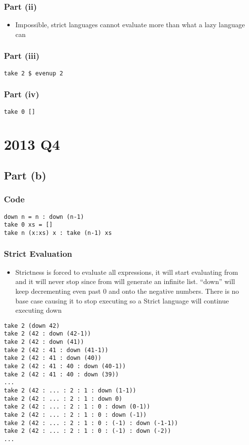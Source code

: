 \documentclass[11pt]{article}
\begin{document}
\subsubsection{Part (ii)}
\label{sec:org7b3fa79}
\begin{itemize}
\item Impossible, strict languages cannot evaluate more than
what a lazy language can
\end{itemize}
\subsubsection{Part (iii)}
\label{sec:org63cda4f}
\begin{verbatim}
take 2 $ evenup 2
\end{verbatim}
\subsubsection{Part (iv)}
\label{sec:org0de3d06}
\begin{verbatim}
take 0 []
\end{verbatim}
\section{2013 Q4}
\label{sec:org2845637}
\subsection{Part (b)}
\label{sec:org5bee4e1}
\subsubsection{Code}
\label{sec:org3b6ee5a}
\begin{verbatim}
down n = n : down (n-1)
take 0 xs = []
take n (x:xs) x : take (n-1) xs
\end{verbatim}
\newpage
\subsubsection{Strict Evaluation}
\label{sec:org21ccd22}
\begin{itemize}
\item Strictness is forced to evaluate all expressions, it will start
evaluating from and it will never stop since from will generate
an infinite list. ``down'' will keep decrementing even past 0 and onto
the negative numbers. There is no base case causing it to stop executing
so a Strict language will continue executing down
\end{itemize}
\begin{verbatim}
take 2 (down 42)
take 2 (42 : down (42-1))
take 2 (42 : down (41))
take 2 (42 : 41 : down (41-1))
take 2 (42 : 41 : down (40))
take 2 (42 : 41 : 40 : down (40-1))
take 2 (42 : 41 : 40 : down (39))
...
take 2 (42 : ... : 2 : 1 : down (1-1))
take 2 (42 : ... : 2 : 1 : down 0)
take 2 (42 : ... : 2 : 1 : 0 : down (0-1))
take 2 (42 : ... : 2 : 1 : 0 : down (-1))
take 2 (42 : ... : 2 : 1 : 0 : (-1) : down (-1-1))
take 2 (42 : ... : 2 : 1 : 0 : (-1) : down (-2))
...
\end{verbatim}
\end{document}
